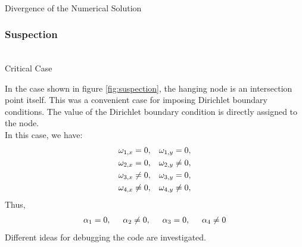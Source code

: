 \documentclass[a4paper,12pt]{article}
\makeatletter
\newenvironment{figurehere}
  {\def\@captype{figure}}
  {}
\makeatother
\begin{document}
\begin{center}
\begin{figurehere}
\\
\caption{Divergence of the Numerical Solution}\label{fig:divergence}
\end{figurehere}
\end{center}
\subsubsection{Suspection}\label{sec:suspection}
\begin{center}
\begin{figurehere}
\\
\caption{Critical Case}\label{fig:suspection}
\end{figurehere}
\end{center}
In the case shown in figure \ref{fig:suspection}, the hanging node is an intersection point itself. This was a convenient case for imposing Dirichlet boundary conditions. The value of the Dirichlet boundary condition is directly assigned to the node.\\
In this case, we have:
\begin{eqnarray}
\omega_{1,x} = 0, \hspace{0.3cm}\omega_{1,y} = 0,\\
\omega_{2,x} = 0, \hspace{0.3cm}\omega_{2,y} \neq 0,\\
\omega_{3,x} \neq 0, \hspace{0.3cm}\omega_{3,y} = 0,\\
\omega_{4,x} \neq 0, \hspace{0.3cm}\omega_{4,y} \neq 0,\\
\end{eqnarray}
Thus,
\begin{eqnarray}
\alpha_1 = 0,\hspace{0.5cm}\alpha_2 \neq 0,\hspace{0.5cm}\alpha_3 = 0,\hspace{0.5cm}\alpha_4\neq 0
\end{eqnarray}
Different ideas for debugging the code are investigated.
\end{document}
